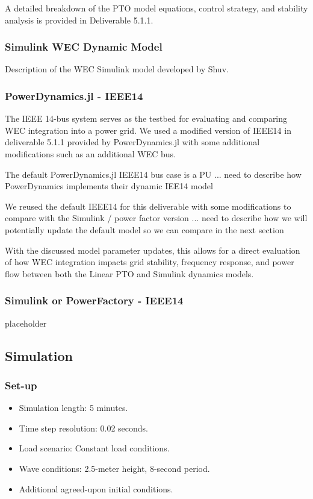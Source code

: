 \documentclass[conference]{IEEEtran}
\begin{document}
    A detailed breakdown of the PTO model equations, control strategy, and stability analysis is provided in Deliverable 5.1.1.

    
    \subsubsection*{Simulink WEC Dynamic Model}
        Description of the WEC Simulink model developed by Shuv.


   \subsubsection*{PowerDynamics.jl - IEEE14}

        The IEEE 14-bus system serves as the testbed for evaluating and comparing WEC integration into a power grid. We used a modified version of IEEE14 in deliverable 5.1.1 provided by PowerDynamics.jl with some additional modifications such as an additional WEC bus. 
        
        The default PowerDynamics.jl IEEE14 bus case is a PU ... need to describe how PowerDynamics implements their dynamic IEE14 model 
        
        We reused the default IEEE14 for this deliverable with some modifications to compare with the Simulink / power factor version ...  need to describe how we will potentially update the default model so we can compare in the next section
        
        
        With the discussed model parameter updates, this allows for a direct evaluation of how WEC integration impacts grid stability, frequency response, and power flow between both the Linear PTO and Simulink dynamics models.
        
    \subsubsection*{Simulink or PowerFactory - IEEE14}
        placeholder


\subsection*{Simulation}
    \subsubsection*{Set-up}
        \begin{itemize}
            \item Simulation length: 5 minutes.
            \item Time step resolution: 0.02 seconds.
            \item Load scenario: Constant load conditions.
            \item Wave conditions: 2.5-meter height, 8-second period.
            \item Additional agreed-upon initial conditions.
        \end{itemize}
        
\end{document}
